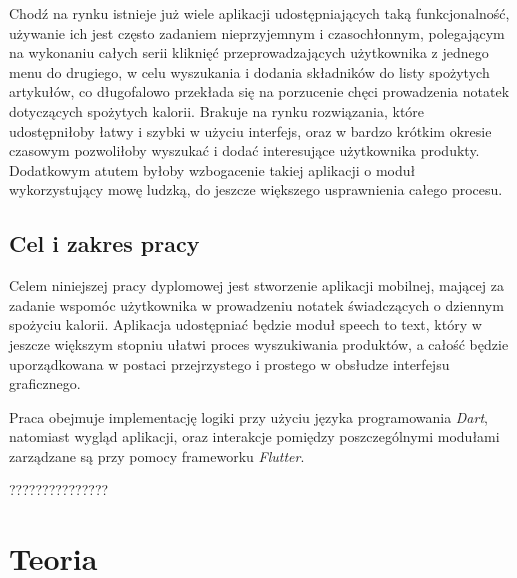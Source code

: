 \documentclass[12pt, a4paper]{article}
\begin{document}
\begin{sloppypar}
{{    Chodź na rynku istnieje już wiele aplikacji udostępniających taką funkcjonalność,
    używanie ich jest często zadaniem nieprzyjemnym i czasochłonnym, polegającym
    na wykonaniu całych serii kliknięć przeprowadzających użytkownika z jednego menu
    do drugiego, w celu wyszukania i dodania składników do listy spożytych artykułów,
    co długofalowo przekłada się na porzucenie chęci prowadzenia notatek dotyczących
    spożytych kalorii. 
    Brakuje na rynku rozwiązania, które udostępniłoby łatwy i szybki
    w użyciu interfejs, oraz w bardzo krótkim okresie czasowym pozwoliłoby wyszukać 
    i dodać interesujące użytkownika produkty. Dodatkowym atutem byłoby wzbogacenie
    takiej aplikacji o moduł wykorzystujący mowę ludzką, do jeszcze większego 
    usprawnienia całego procesu.
  }
  \subsection{Cel i zakres pracy}
  {
    Celem niniejszej pracy dyplomowej jest stworzenie aplikacji mobilnej, mającej 
    za zadanie wspomóc użytkownika w prowadzeniu notatek świadczących o dziennym
    spożyciu kalorii. Aplikacja udostępniać będzie moduł speech to text,
    który w jeszcze większym stopniu ułatwi proces wyszukiwania produktów, a całość
    będzie uporządkowana w postaci przejrzystego i prostego w obsłudze interfejsu
    graficznego.

    Praca obejmuje implementację logiki przy użyciu języka programowania \emph{Dart},
    natomiast wygląd aplikacji, oraz interakcje pomiędzy poszczególnymi modułami
    zarządzane są przy pomocy frameworku \emph{Flutter}.

    \color{red} ???????????????
  }
}

\section{Teoria}
{
}
\end{sloppypar}
\end{document}

